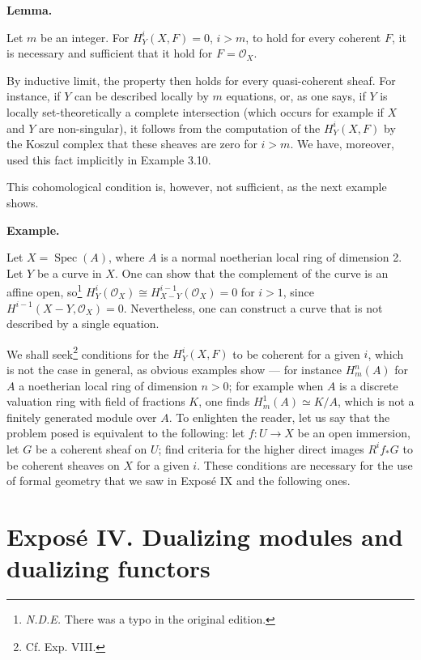 \documentclass[
]{article}
\begin{document}
\textbf{Lemma.}

Let \(m\) be an integer. For \(H^{i}_{Y}(X, F) = 0\), \(i > m\), to hold
for every coherent \(F\), it is necessary and sufficient that it hold
for \(F = \mathcal{O}_{X}\).

By inductive limit, the property then holds for every quasi-coherent
sheaf. For instance, if \(Y\) can be described locally by \(m\)
equations, or, as one says, if \(Y\) is locally set-theoretically a
complete intersection (which occurs for example if \(X\) and \(Y\) are
non-singular), it follows from the computation of the
\(H^{i}_{Y}(X, F)\) by the Koszul complex that these sheaves are zero
for \(i > m\). We have, moreover, used this fact implicitly in Example
3.10.

This cohomological condition is, however, not sufficient, as the next
example shows.

\textbf{Example.}

Let \(X = \operatorname{Spec}(A)\), where \(A\) is a normal noetherian
local ring of dimension 2. Let \(Y\) be a curve in \(X\). One can show
that the complement of the curve is an affine open, so\footnote{\emph{N.D.E.}
  There was a typo in the original edition.}
\(H^{i}_{Y}(\mathcal{O}_{X}) \cong H^{i-1}_{X-Y}(\mathcal{O}_{X}) = 0\)
for \(i > 1\), since \(H^{i-1}(X - Y, \mathcal{O}_{X}) = 0\).
Nevertheless, one can construct a curve that is not described by a
single equation.

We shall seek\footnote{Cf. Exp. VIII.} conditions for the
\(H^{i}_{Y}(X, F)\) to be coherent for a given \(i\), which is not the
case in general, as obvious examples show --- for instance
\(H^{n}_{m}(A)\) for \(A\) a noetherian local ring of dimension
\(n > 0\); for example when \(A\) is a discrete valuation ring with
field of fractions \(K\), one finds \(H^{1}_{m}(A) \simeq K/A\), which
is not a finitely generated module over \(A\). To enlighten the reader,
let us say that the problem posed is equivalent to the following: let
\(f: U \to X\) be an open immersion, let \(G\) be a coherent sheaf on
\(U\); find criteria for the higher direct images \(R^{i} f_{*} G\) to
be coherent sheaves on \(X\) for a given \(i\). These conditions are
necessary for the use of formal geometry that we saw in Exposé IX and
the following ones.

\section{Exposé IV. Dualizing modules and dualizing
functors}\label{exposuxe9-iv.-dualizing-modules-and-dualizing-functors}
\end{document}
